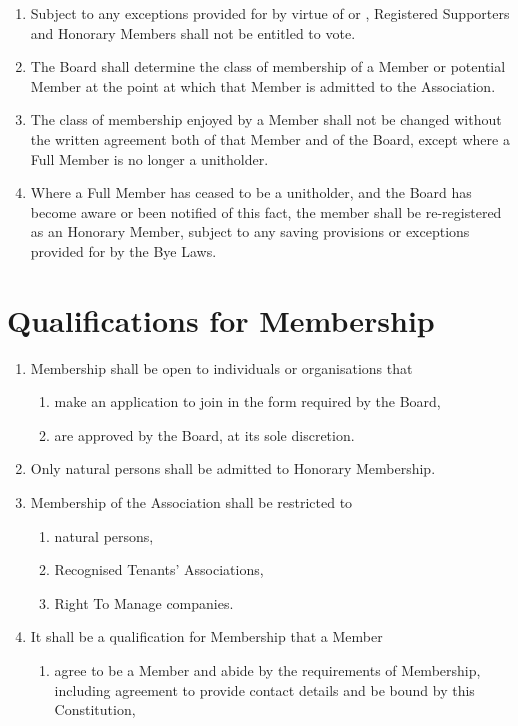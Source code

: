 \documentclass[10pt]{mk-articles-of-association}
\newcommand{\mysection}[1]{
  \end{enumerate}
  \section*{#1}
  \begin{enumerate}[resume]
}
\newcommand{\EC}[0]{Board}
\newcommand{\Exec}[0]{\EC{} }
\newcommand{\RTA}[0]{Recognised Tenants' Association}
\begin{document}
\begin{enumerate}
  \item Subject to any exceptions provided for by virtue of
     or ,
    Registered Supporters and
    Honorary Members shall not be entitled to vote.

  \item The \Exec shall determine the class of membership of a Member
    or potential Member at the point at which that Member is admitted
    to the Association.

  \item The class of membership enjoyed by a Member
    shall not be changed without the written agreement both of that
    Member and of the \EC{}, except where a Full Member is no
    longer a unitholder.

  \item Where a Full Member has ceased to be a unitholder, and the
    \Exec has become aware or been notified of this fact, the member
    shall be re-registered as an Honorary Member, subject to any
    saving provisions or exceptions provided for by the Bye Laws.


\mysection{Qualifications for Membership}

  \item Membership shall be open to individuals or organisations that
    \begin{enumerate}
      \item make an application to join in the form required by the \EC, \ITand
      \item are approved by the \EC{}, at its sole discretion.
    \end{enumerate}

  \item Only natural persons shall be admitted to Honorary Membership.

  \item Membership of the Association shall be restricted to
    \begin{enumerate}
    \item natural persons,
    \item \RTA{}s, \ITand
    \item Right To Manage companies.
    \end{enumerate}

  \item It shall be a qualification for Membership that a Member
    \begin{enumerate}

    \item agree to be a Member and abide by the requirements of
      Membership, including agreement to provide contact details and
      be bound by this Constitution,


\end{enumerate}
\end{enumerate}
\end{document}
